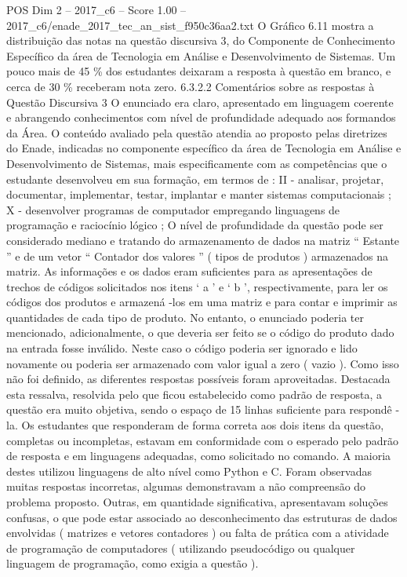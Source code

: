 \begin{textsample}{POS Dim 2 – 2017\_c6 – Score 1.00 – 2017\_c6/enade\_2017\_tec\_an\_sist\_f950c36aa2.txt}
O Gráfico 6.11 mostra a distribuição das notas na questão discursiva 3, do Componente de Conhecimento Específico da área de Tecnologia em Análise e Desenvolvimento de Sistemas.
Um pouco mais de 45 \% dos estudantes deixaram a resposta à questão em branco, e cerca de 30 \% receberam nota zero. 6.3.2.2 Comentários sobre as respostas à Questão Discursiva 3 O enunciado era claro, apresentado em linguagem coerente e abrangendo conhecimentos com nível de profundidade adequado aos formandos da Área.
O conteúdo avaliado pela questão atendia ao proposto pelas diretrizes do Enade, indicadas no componente específico da área de Tecnologia em Análise e Desenvolvimento de Sistemas, mais especificamente com as competências que o estudante desenvolveu em sua formação, em termos de : II - analisar, projetar, documentar, implementar, testar, implantar e manter sistemas computacionais ; X - desenvolver programas de computador empregando linguagens de programação e raciocínio lógico ; O nível de profundidade da questão pode ser considerado mediano e tratando do armazenamento de dados na matriz “ Estante ” e de um vetor “ Contador dos valores ” ( tipos de produtos ) armazenados na matriz.
As informações e os dados eram suficientes para as apresentações de trechos de códigos solicitados nos itens ‘ a ’ e ‘ b ’, respectivamente, para ler os códigos dos produtos e armazená -los em uma matriz e para contar e imprimir as quantidades de cada tipo de produto.
No entanto, o enunciado poderia ter mencionado, adicionalmente, o que deveria ser feito se o código do produto dado na entrada fosse inválido.
Neste caso o código poderia ser ignorado e lido novamente ou poderia ser armazenado com valor igual a zero ( vazio ).
Como isso não foi definido, as diferentes respostas possíveis foram aproveitadas.
Destacada esta ressalva, resolvida pelo que ficou estabelecido como padrão de resposta, a questão era muito objetiva, sendo o espaço de 15 linhas suficiente para respondê -la.
Os estudantes que responderam de forma correta aos dois itens da questão, completas ou incompletas, estavam em conformidade com o esperado pelo padrão de resposta e em linguagens adequadas, como solicitado no comando.
A maioria destes utilizou linguagens de alto nível como Python e C.
Foram observadas muitas respostas incorretas, algumas demonstravam a não compreensão do problema proposto.
Outras, em quantidade significativa, apresentavam soluções confusas, o que pode estar associado ao desconhecimento das estruturas de dados envolvidas ( matrizes e vetores contadores ) ou falta de prática com a atividade de programação de computadores ( utilizando pseudocódigo ou qualquer linguagem de programação, como exigia a questão ).

\end{textsample}
